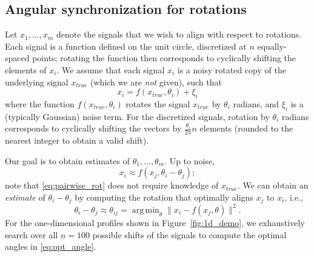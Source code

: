 \documentclass{pnastwo}
\DeclareMathOperator*{\argmin}{arg\,min}
\begin{document}
\begin{article}




\begin{materials}

\section{Angular synchronization for rotations\cite{singer2011angular}}

Let $x_1, \dots, x_m$ denote the signals that we wish to align with respect to rotations. 
%
Each signal is a function defined on the unit circle, discretized at $n$ equally-spaced points;
rotating the function then corresponds to cyclically shifting the elements of $x_i$.
%
We assume that each signal $x_i$ is a noisy rotated copy of the underlying signal $x_{true}$ (which we are {\em not} given), such that 
\begin{equation}
x_i = f(x_{true}, \theta_i) + \xi_i
\end{equation}
where the function $f(x_{true}, \theta_i)$ rotates the signal $x_{true}$ by $\theta_i$ radians, and $\xi_i$ is a (typically Gaussian) noise term. 
%
For the discretized signals, rotation by $\theta_i$ radians corresponds to cyclically shifting the vectors by $\frac{\theta_i}{2 \pi} n$ elements (rounded to the nearest integer to obtain a valid shift).

Our goal is to obtain estimates of $\theta_1, \dots, \theta_m$.
%
Up to noise, 
\begin{equation} \label{eq:pairwise_rot}
x_i \approx f(x_j, \theta_i - \theta_j) ;
\end{equation}
 note that \eqref{eq:pairwise_rot} does not require knowledge of $x_{true}$.
%
We can obtain an {\em estimate} of $\theta_i - \theta_j$ by computing the rotation that optimally aligns $x_j$ to $x_i$, 
i.e., %
%
\begin{equation} \label{eq:opt_angle}
\theta_i - \theta_j \approx \theta_{ij} = \argmin_{\theta} \|x_i - f(x_j, \theta)\|^2.
\end{equation}
%
For the one-dimensional profiles shown in Figure~\ref{fig:1d_demo}, we exhaustively search over all $n=100$ possible shifts of the signals to compute the optimal angles in \eqref{eq:opt_angle}. 


\end{materials}
\end{article}
\end{document}
